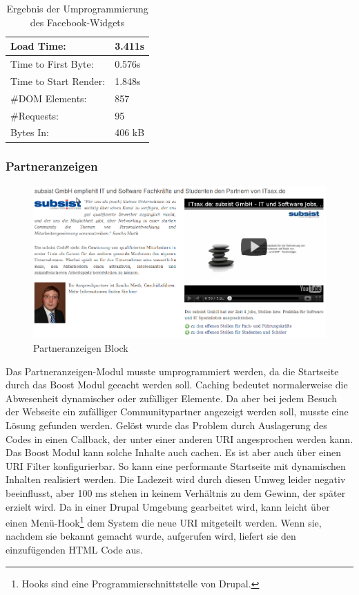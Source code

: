 \begin{table}[!ht]
\centering
\caption{Ergebnis der Umprogrammierung des Facebook-Widgets}
    \begin{tabular}{ | p{3cm} | p{1.5cm} | }
    \hline
    Load Time: 			& 3.411s 	\\ \hline
    Time to First Byte:		& 0.576s  	\\ \hline
    Time to Start Render:	& 1.848s	\\ \hline
    \#DOM Elements:		& 857 		\\ \hline
    \#Requests:			& 95 		\\ \hline
    Bytes In:			& 406 kB 	\\ \hline
    \hline
    \end{tabular}
\end{table}


\subsubsection{Partneranzeigen}
\begin{figure}[!ht]
  \centering
  \includegraphics[width=\textwidth]{material/partneranzeigen.png}
  \caption{Partneranzeigen Block}
  \label{fig:partneranzeigen}
\end{figure}
Das Partneranzeigen-Modul musste umprogrammiert werden, da die Startseite durch das Boost Modul gecacht werden soll. Caching bedeutet normalerweise die Abwesenheit dynamischer oder zufälliger Elemente. Da aber bei jedem Besuch der Webseite ein zufälliger Communitypartner angezeigt werden soll, musste eine Lösung gefunden werden. Gelöst wurde das Problem durch Auslagerung des Codes in einen Callback, der unter einer anderen URI angesprochen werden kann. Das Boost Modul kann solche Inhalte auch cachen. Es ist aber auch über einen URI Filter konfigurierbar. So kann eine performante Startseite mit dynamischen Inhalten realisiert werden. Die Ladezeit wird durch diesen Umweg leider negativ beeinflusst, aber 100 ms stehen in keinem Verhältnis zu dem Gewinn, der später erzielt wird. Da in einer Drupal Umgebung gearbeitet wird, kann leicht über einen Menü-Hook\footnote{Hooks sind eine Programmierschnittstelle von Drupal.} dem System die neue URI mitgeteilt werden. Wenn sie, nachdem sie bekannt gemacht wurde, aufgerufen wird, liefert sie den einzufügenden HTML Code aus.

